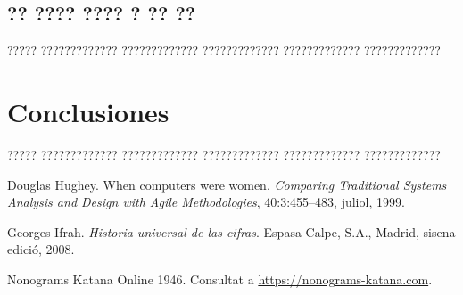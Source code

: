 \documentclass[11pt,spanish,listoffigures,listoftables]{tfgetsinf}
\begin{document}

    



\section{?? ???? ???? ? ?? ??}

????? ????????????? ????????????? ????????????? ????????????? ?????????????


\chapter{Conclusiones}

????? ????????????? ????????????? ????????????? ????????????? ????????????? 







\begin{thebibliography}{10}

   Douglas Hughey. \newblock When computers were women. \newblock
   \textit{Comparing Traditional Systems Analysis and Design with Agile Methodologies}, 40:3:455--483, juliol, 1999.

   Georges Ifrah. \newblock \textit{Historia universal de las cifras}. \newblock
   Espasa Calpe, S.A., Madrid, sisena edició, 2008.

   Nonograms Katana Online
   1946. \newblock Consultat a
   \url{https://nonograms-katana.com}.

\end{thebibliography}
\cleardoublepage
\end{document}
